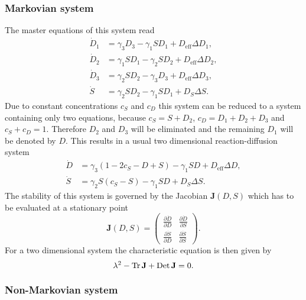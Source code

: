 \subsubsection{Markovian system}

The master equations of this system read
%
\begin{align}
\nonumber \dot{D}_1 &= \gamma_3 D_3-\gamma_1 S D_1 + D_{\text{eff}}\Delta D_1,\\
\nonumber \dot{D}_2 &= \gamma_1 S D_1-\gamma_2 S D_2 + D_{\text{eff}}\Delta D_2,\\
\nonumber \dot{D}_3 &= \gamma_2 S D_2-\gamma_3 D_3 + D_{\text{eff}}\Delta D_3,\\
\label{eq:4dseq} \dot{S} &= \gamma_2 S D_2-\gamma_1 S D_1 + D_S\Delta S.
\end{align}
%
Due to constant concentrations $c_S$ and $c_D$ this system can be reduced to a system containing only two equations, because $c_S=S+D_2$, $c_D=D_1+D_2+D_3$ and $c_S+c_D=1$. Therefore $D_2$ and $D_3$ will be eliminated and the remaining $D_1$ will be denoted by $D$. This results in a usual two dimensional reaction-diffusion system
%
\begin{align}
\nonumber \dot{D} &= \gamma_3\left(1-2c_S-D+S\right)-\gamma_1 S D + D_{\text{eff}} \Delta D,\\
\label{eq:2dseq} \dot{S} &= \gamma_2 S \left(c_S-S\right)-\gamma_1 S D + D_S \Delta S. 
\end{align}
%
The stability of this system is governed by the Jacobian $\mathbf{J}(D,S)$ which has to be evaluated at a stationary point
%
\begin{equation}
	\mathbf{J}(D,S) = \begin{pmatrix}
	                  	\frac{\partial \dot{D}}{\partial D} & \frac{\partial \dot{D}}{\partial S} \\
						\frac{\partial \dot{S}}{\partial D} & \frac{\partial \dot{S}}{\partial S} 
	                  \end{pmatrix}.
\label{eq:Jacob_sheepndog}
\end{equation}
%
For a two dimensional system the characteristic equation is then given by
%
\begin{equation}
	\lambda^2-\operatorname{Tr}\mathbf{J}+\operatorname{Det}\mathbf{J} = 0.
\end{equation}

\subsubsection{Non-Markovian system}

